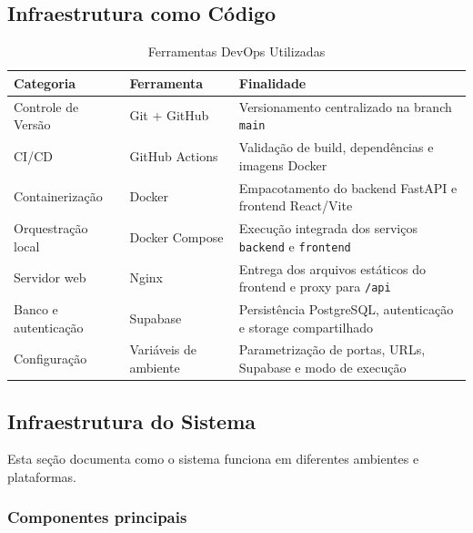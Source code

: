 \documentclass[11pt,a4paper]{article}
\begin{document}
\subsection{Infraestrutura como Código}

\begin{table}[H]
\centering
\caption{Ferramentas DevOps Utilizadas}
\label{tab:devops-tools}
\begin{tabular}{|l|l|p{6cm}|}
\hline
\textbf{Categoria} & \textbf{Ferramenta} & \textbf{Finalidade} \\
\hline
Controle de Versão & Git + GitHub & Versionamento centralizado na branch \texttt{main} \\
CI/CD & GitHub Actions & Validação de build, dependências e imagens Docker \\
Containerização & Docker & Empacotamento do backend FastAPI e frontend React/Vite \\
Orquestração local & Docker Compose & Execução integrada dos serviços \texttt{backend} e \texttt{frontend} \\
Servidor web & Nginx & Entrega dos arquivos estáticos do frontend e proxy para \texttt{/api} \\
Banco e autenticação & Supabase & Persistência PostgreSQL, autenticação e storage compartilhado \\
Configuração & Variáveis de ambiente & Parametrização de portas, URLs, Supabase e modo de execução \\
\hline
\end{tabular}
\end{table}

\subsection{Infraestrutura do Sistema}

Esta seção documenta como o sistema funciona em diferentes ambientes e plataformas.

\subsubsection{Componentes principais}
\end{document}
